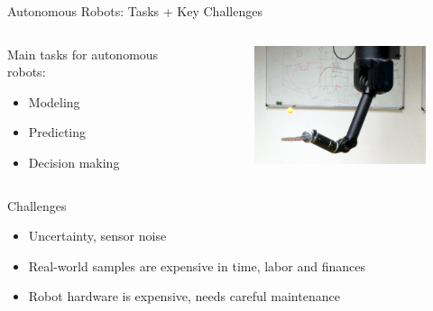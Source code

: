 \documentclass[navbarinfooter, 12pt]{sdqbeamer}
\begin{document}
\begin{frame}{Autonomous Robots: Tasks + Key Challenges}
\begin{columns}[c]
  \begin{column}{7cm}
    Main tasks for autonomous robots: \\
      \begin{itemize}
      \item Modeling
      \item Predicting
      \item Decision making
      \end{itemize}
  \end{column}
  \begin{column}{5cm}
    \begin{figure}[ht]
      \centering
      \includegraphics[height=3.5cm]{figures/robot_table_tennis.png}
    \end{figure}

  \end{column}
\end{columns}
\begin{block}{Challenges}
  \begin{itemize}
  \item Uncertainty, sensor noise
  \item Real-world samples are expensive in time, labor and finances
  \item Robot hardware is expensive, needs careful maintenance    
  \end{itemize}
\end{block}
\end{frame}
\end{document}
